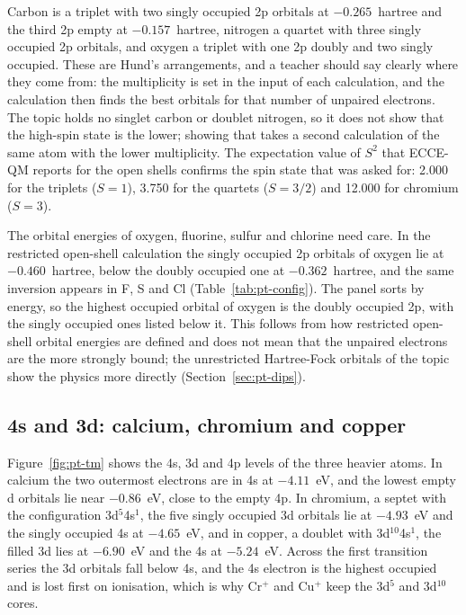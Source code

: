 Carbon is a triplet with two singly occupied 2p orbitals at $-0.265$~hartree and the third 2p empty at $-0.157$~hartree, nitrogen a quartet with three singly occupied 2p orbitals, and oxygen a triplet with one 2p doubly and two singly occupied. These are Hund's arrangements, and a teacher should say clearly where they come from: the multiplicity is set in the input of each calculation, and the calculation then finds the best orbitals for that number of unpaired electrons. The topic holds no singlet carbon or doublet nitrogen, so it does not show that the high-spin state is the lower; showing that takes a second calculation of the same atom with the lower multiplicity. The expectation value of $S^2$ that ECCE-QM reports for the open shells confirms the spin state that was asked for: 2.000 for the triplets ($S = 1$), 3.750 for the quartets ($S = 3/2$) and 12.000 for chromium ($S = 3$).

The orbital energies of oxygen, fluorine, sulfur and chlorine need care. In the restricted open-shell calculation the singly occupied 2p orbitals of oxygen lie at $-0.460$~hartree, below the doubly occupied one at $-0.362$~hartree, and the same inversion appears in F, S and Cl (Table~\ref{tab:pt-config}). The  panel sorts by energy, so the highest occupied orbital of oxygen is the doubly occupied 2p, with the singly occupied ones listed below it. This follows from how restricted open-shell orbital energies are defined and does not mean that the unpaired electrons are the more strongly bound; the unrestricted Hartree-Fock orbitals of the topic  show the physics more directly (Section~\ref{sec:pt-dips}).

\subsection{4s and 3d: calcium, chromium and copper}
Figure~\ref{fig:pt-tm} shows the 4s, 3d and 4p levels of the three heavier atoms. In calcium the two outermost electrons are in 4s at $-4.11$~eV, and the lowest empty d orbitals lie near $-0.86$~eV, close to the empty 4p. In chromium, a septet with the configuration 3d$^5$4s$^1$, the five singly occupied 3d orbitals lie at $-4.93$~eV and the singly occupied 4s at $-4.65$~eV, and in copper, a doublet with 3d$^{10}$4s$^1$, the filled 3d lies at $-6.90$~eV and the 4s at $-5.24$~eV. Across the first transition series the 3d orbitals fall below 4s, and the 4s electron is the highest occupied and is lost first on ionisation, which is why Cr$^+$ and Cu$^+$ keep the 3d$^5$ and 3d$^{10}$ cores.


